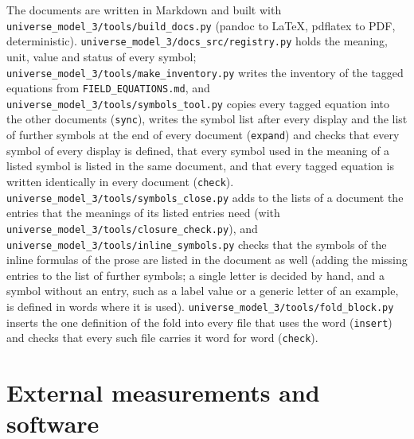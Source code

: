 \documentclass[
  10pt,
]{article}
\begin{document}
The documents are written in Markdown and built with
\texttt{universe\_model\_3/tools/build\_docs.py} (pandoc to LaTeX,
pdflatex to PDF, deterministic).
\texttt{universe\_model\_3/docs\_src/registry.py} holds the meaning,
unit, value and status of every symbol;
\texttt{universe\_model\_3/tools/make\_inventory.py} writes the
inventory of the tagged equations from \texttt{FIELD\_EQUATIONS.md}, and
\texttt{universe\_model\_3/tools/symbols\_tool.py} copies every tagged
equation into the other documents (\texttt{sync}), writes the symbol
list after every display and the list of further symbols at the end of
every document (\texttt{expand}) and checks that every symbol of every
display is defined, that every symbol used in the meaning of a listed
symbol is listed in the same document, and that every tagged equation is
written identically in every document (\texttt{check}).
\texttt{universe\_model\_3/tools/symbols\_close.py} adds to the lists of
a document the entries that the meanings of its listed entries need
(with \texttt{universe\_model\_3/tools/closure\_check.py}), and
\texttt{universe\_model\_3/tools/inline\_symbols.py} checks that the
symbols of the inline formulas of the prose are listed in the document
as well (adding the missing entries to the list of further symbols; a
single letter is decided by hand, and a symbol without an entry, such as
a label value or a generic letter of an example, is defined in words
where it is used). \texttt{universe\_model\_3/tools/fold\_block.py}
inserts the one definition of the fold into every file that uses the
word (\texttt{insert}) and checks that every such file carries it word
for word (\texttt{check}).

\hypertarget{external-measurements-and-software}{%
\section{External measurements and
software}\label{external-measurements-and-software}}
\end{document}
